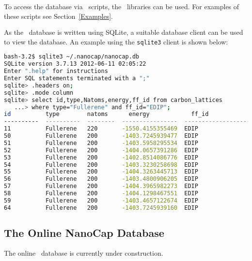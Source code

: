 To access the database via \python~scripts, the \nanocap~libraries can be used. For examples of these scripts see Section~\ref{Examples}.

As the \nanocap~database is written using SQLite, a suitable database client can be used to view the database. An example using the \texttt{sqlite3} client is shown below: 

\begin{lstlisting}[keywordstyle={\color{myterminalfont}},
			language={sh},
			commentstyle={\it\color{myterminalfont}},
			emphstyle={\ttb\color{myterminalfont}},
			stringstyle={\color{myterminalfont}},
			showstringspaces={false},
			otherkeywords={self},
			emph={MyClass,__init__},
			frame={},
			basicstyle={\ttm\color{myterminalfont}},
			morekeywords={True,False},
			captionpos={b},
			backgroundcolor={\color{myterminalbg}}]		
bash-3.2$ sqlite3 ~/.nanocap/nanocap.db
SQLite version 3.7.13 2012-06-11 02:05:22
Enter ".help" for instructions
Enter SQL statements terminated with a ";"
sqlite> .headers on;
sqlite> .mode column
sqlite> select id,type,Natoms,energy,ff_id from carbon_lattices
   ...> where type="Fullerene" and ff_id="EDIP";
id          type        natoms      energy            ff_id               
----------  ----------  --------  ----------------  --------------------
11          Fullerene   220       -1550.4155355469  EDIP                   
50          Fullerene   200       -1403.7245939477  EDIP                
51          Fullerene   200       -1403.5958295534  EDIP                
52          Fullerene   200       -1404.0657391286  EDIP                
53          Fullerene   200       -1402.8514086776  EDIP                
54          Fullerene   200       -1403.3230258698  EDIP                
55          Fullerene   200       -1404.3263445713  EDIP                
56          Fullerene   200       -1403.4800906205  EDIP                
57          Fullerene   200       -1404.3965982273  EDIP                
58          Fullerene   200       -1404.1298467551  EDIP                
59          Fullerene   200       -1403.4657122674  EDIP                
64          Fullerene   200       -1403.7245939160  EDIP
\end{lstlisting}


\subsection{The Online NanoCap Database}

The online \nanocap~database is currently under construction.

